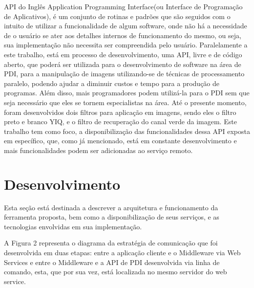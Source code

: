 \documentclass[12pt]{article}
\begin{document}
API do Inglês Application Programming Interface(ou Interface de Programação de Aplicativos), é um conjunto de rotinas e padrões que são seguidos com o intuito de utilizar a funcionalidade de algum software, onde não há a necessidade de o usuário se ater aos detalhes internos de funcionamento do mesmo, ou seja, sua implementação não necessita ser compreendida pelo usuário. 
Paralelamente a este trabalho, está em processo de desenvolvimento, uma API, livre e de código aberto, que poderá ser utilizada para o desenvolvimento de software na área de PDI, para a manipulação de imagens utilizando-se de técnicas de processamento paralelo, podendo ajudar a diminuir custos e tempo para a produção de programas. Além disso, mais programadores podem utilizá-la para o PDI sem que seja necessário que eles se tornem especialistas na área.
Até o presente momento, foram desenvolvidos dois filtros para aplicação em imagens, sendo eles o filtro preto e branco YIQ, e o filtro de recuperação do canal verde da imagem. Este trabalho tem como foco, a disponibilização das funcionalidades dessa API exposta em específico, que, como já mencionado, está em constante desenvolvimento e mais funcionalidades podem ser adicionadas ao serviço remoto.

\section{Desenvolvimento}

Esta seção está destinada a descrever a arquitetura e funcionamento da ferramenta proposta, bem como a disponibilização de seus serviços, e as tecnologias envolvidas em sua implementação.



A Figura 2 representa o diagrama da estratégia de comunicação que
foi desenvolvida em duas etapas: entre a aplicação cliente e o Middleware via Web Services e entre
o Middleware e a API de PDI desenvolvida via linha de comando, esta, que por sua vez, está localizada no mesmo servidor do web service.
\end{document}
